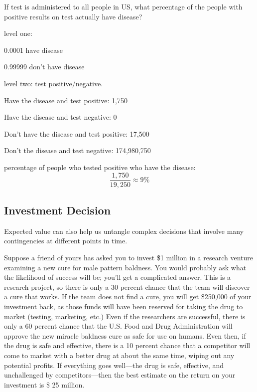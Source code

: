 \documentclass[letterpaper, landscape]{exam}
\begin{document}
  If test is administered to all people in US, what percentage of the people
  with positive results on test actually have disease?


  \begin{solution}
    level one:
    \begin{itemize*}
      \item 0.0001 have disease
      \item 0.99999 don't have disease
    \end{itemize*}

    level two: test positive/negative. 
    \begin{itemize*}
      \item Have the disease and test positive: 1,750
      \item Have the disease and test negative: 0
      \item Don't have the disease and test positive: 17,500
      \item Don't the disease and test negative: 174,980,750
    \end{itemize*}

    percentage of people who tested positive who have the disease:
    \[
      \frac{1,750}{19,250} \approx 9\%
    \]

  \end{solution}

  \subsection{Investment Decision}
  Expected value can also help us untangle complex decisions that involve many
  contingencies at different points in time. 

  Suppose a friend of yours has asked you to invest \$1 million in a research
  venture examining a new cure for male pattern baldness. You would probably ask
  what the likelihood of success will be; you’ll get a complicated answer. This
  is a research project, so there is only a 30 percent chance that the team will
  discover a cure that works. If the team does not find a cure, you will get
  \$250,000 of your investment back, as those funds will have been reserved for
  taking the drug to market (testing, marketing, etc.) Even if the researchers
  are successful, there is only a 60 percent chance that the U.S. Food and Drug
  Administration will approve the new miracle baldness cure as safe for use on
  humans. Even then, if the drug is safe and effective, there is a 10 percent
  chance that a competitor will come to market with a better drug at about the
  same time, wiping out any potential profits. If everything goes well---the drug
  is safe, effective, and unchallenged by competitors---then the best estimate
  on the return on your investment is \$ 25 million. 
\end{document}

